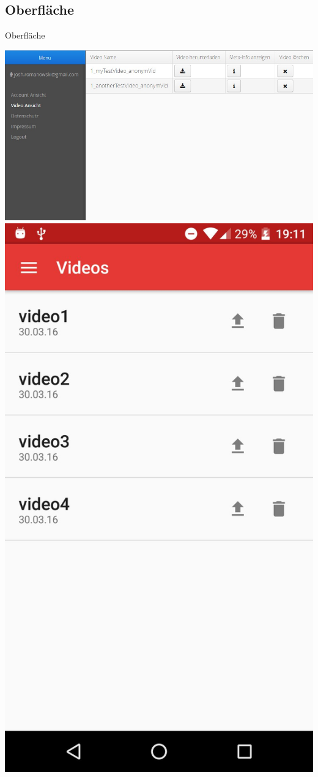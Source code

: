 \documentclass[19pt]{beamer}
\begin{document}
\subsection{Oberfläche}
\begin{frame}{Oberfläche}
\begin{center}
\includegraphics[scale=0.3]{resources/ServiceDemo.jpg}
\includegraphics[scale=0.1]{resources/AppDemo.jpg}
\end{center}
\end{frame}
\end{document}

